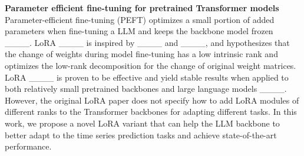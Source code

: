 \noindent\textbf{Parameter efficient fine-tuning for pretrained Transformer models} \quad Parameter-efficient fine-tuning (PEFT) optimizes a small portion of added parameters when fine-tuning a LLM and keeps the backbone model frozen ____. LoRA ____ is inspired by ____ and ____, and hypothesizes that the change of weights during model fine-tuning has a low intrinsic rank and optimizes the low-rank decomposition for the change of original weight matrices. LoRA ____ is proven to be effective and yield stable results when applied to both relatively small pretrained backbones and large language models ____. However, the original LoRA paper does not specify how to add LoRA modules of different ranks to the Transformer backbones for adapting different tasks. In this work, we propose a novel LoRA variant that can help the LLM backbone to better adapt to the time series prediction tasks and achieve state-of-the-art performance.